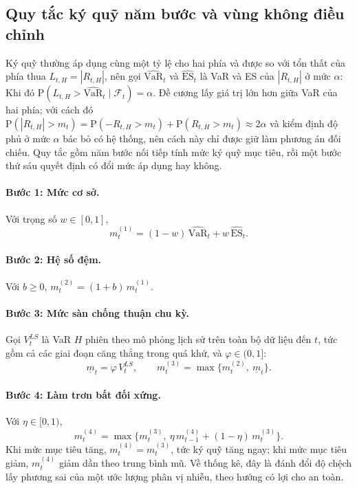 \documentclass[12pt,a4paper]{article}
\theoremstyle{definition}
\theoremstyle{remark}
\newcommand{\Prob}{\mathrm{P}}
\newcommand{\VaR}{\mathrm{VaR}}
\newcommand{\ES}{\mathrm{ES}}
\newcommand{\Fcal}{\mathcal{F}}
\begin{document}
\subsection{Quy tắc ký quỹ năm bước và vùng không điều chỉnh}\label{sec:quytac}

Ký quỹ thường áp dụng cùng một tỷ lệ cho hai phía và được so với tổn thất của phía thua $L_{t,H}=|R_{t,H}|$, nên gọi $\widehat{\VaR}_t$ và $\widehat{\ES}_t$ là VaR và ES của $|R_{t,H}|$ ở mức $\alpha$: Khi đó $\Prob(L_{t,H}>\widehat{\VaR}_t\mid\Fcal_t)=\alpha$. Đề cương lấy giá trị lớn hơn giữa VaR của hai phía; với cách đó $\Prob(|R_{t,H}|>m_t)=\Prob(-R_{t,H}>m_t)+\Prob(R_{t,H}>m_t)\approx2\alpha$ và kiểm định độ phủ ở mức $\alpha$ bác bỏ có hệ thống, nên cách này chỉ được giữ làm phương án đối chiếu. Quy tắc gồm năm bước nối tiếp tính mức ký quỹ mục tiêu, rồi một bước thứ sáu quyết định có đổi mức áp dụng hay không.

\paragraph{Bước 1: Mức cơ sở.} Với trọng số $w\in[0,1]$,
\begin{equation}
m^{(1)}_t=(1-w)\,\widehat{\VaR}_t+w\,\widehat{\ES}_t .
\end{equation}
\paragraph{Bước 2: Hệ số đệm.} Với $b\ge0$, $m^{(2)}_t=(1+b)\,m^{(1)}_t$.

\paragraph{Bước 3: Mức sàn chống thuận chu kỳ.} Gọi $V^{LS}_t$ là VaR $H$ phiên theo mô phỏng lịch sử trên toàn bộ dữ liệu đến $t$, tức gồm cả các giai đoạn căng thẳng trong quá khứ, và $\varphi\in(0,1]$:
\begin{equation}
\underline m_t=\varphi\,V^{LS}_t,\qquad m^{(3)}_t=\max\big\{m^{(2)}_t,\ \underline m_t\big\}.
\end{equation}
\paragraph{Bước 4: Làm trơn bất đối xứng.} Với $\eta\in[0,1)$,
\begin{equation}
m^{(4)}_t=\max\big\{m^{(3)}_t,\ \eta\,m^{(4)}_{t-1}+(1-\eta)\,m^{(3)}_t\big\}.
\end{equation}
Khi mức mục tiêu tăng, $m^{(4)}_t=m^{(3)}_t$, tức ký quỹ tăng ngay; khi mức mục tiêu giảm, $m^{(4)}_t$ giảm dần theo trung bình mũ. Về thống kê, đây là đánh đổi độ chệch lấy phương sai của một ước lượng phân vị nhiễu, theo hướng có lợi cho an toàn.
\end{document}
